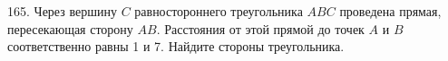 165. Через вершину $C$ равностороннего треугольника $ABC$ проведена прямая, пересекающая сторону $AB.$ Расстояния от этой прямой до точек $A$ и $B$ соответственно равны 1 и 7. Найдите стороны треугольника.\\
